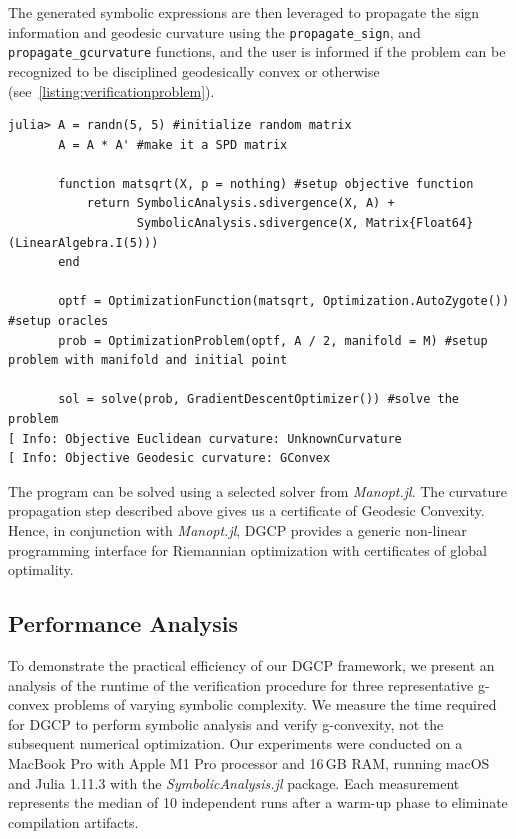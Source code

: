 \documentclass[twoside,11pt]{article}
\begin{document}
The generated symbolic expressions are then leveraged to propagate the sign information and geodesic curvature using the \texttt{propagate\_sign}, and \texttt{propagate\_gcurvature} functions, and the user is informed if the problem can be recognized to be disciplined geodesically convex or otherwise (see~\ref{listing:verificationproblem}).
%
\begin{listing}[hbt!]
\begin{verbatim}
julia> A = randn(5, 5) #initialize random matrix
       A = A * A' #make it a SPD matrix

       function matsqrt(X, p = nothing) #setup objective function
           return SymbolicAnalysis.sdivergence(X, A) +
                  SymbolicAnalysis.sdivergence(X, Matrix{Float64}(LinearAlgebra.I(5)))
       end

       optf = OptimizationFunction(matsqrt, Optimization.AutoZygote()) #setup oracles
       prob = OptimizationProblem(optf, A / 2, manifold = M) #setup problem with manifold and initial point

       sol = solve(prob, GradientDescentOptimizer()) #solve the problem
[ Info: Objective Euclidean curvature: UnknownCurvature
[ Info: Objective Geodesic curvature: GConvex
\end{verbatim}
\caption{Solving the matrix square root problem in geodesically convex formulation from \citep{sra2015matrix} with Geodesic Convexity certificate.}
\end{listing}\label{listing:verificationproblem}
%
The program can be solved using a selected solver from \textsl{Manopt.jl}. The curvature propagation step described above gives us a certificate of Geodesic Convexity. Hence, in conjunction with \textsl{Manopt.jl}, DGCP provides a generic non-linear programming interface for Riemannian optimization with certificates of global optimality. %

\subsection{Performance Analysis}

To demonstrate the practical efficiency of our DGCP framework, we present an %
analysis of the runtime of the verification procedure for three representative g-convex problems of varying symbolic complexity. We measure the time required for DGCP to perform symbolic analysis and verify g-convexity, not the subsequent numerical optimization.
Our experiments were conducted on a MacBook Pro with Apple M1 Pro processor and 16\,GB RAM, running macOS and Julia 1.11.3 with the \textsl{SymbolicAnalysis.jl} package. Each measurement represents the median of 10 independent runs after a %
warm-up phase to eliminate compilation artifacts. %
\end{document}
